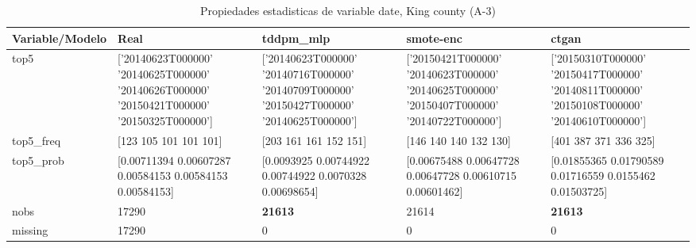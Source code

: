 \begin{table}[H]
\centering
\fontsize{8}{14}\selectfont
\caption{Propiedades  estadisticas de variable date, King county (A-3)}
\label{table-stats-king county-a-3-date}
\begin{tabular}{|l|m{10em}|m{10em}|m{10em}|m{10em}|}
\hline
 \rowcolor[gray]{0.8}
Variable/Modelo & Real & tddpm\_mlp & smote-enc & ctgan \\
\hline top5 & ['20140623T000000' '20140625T000000' '20140626T000000' '20150421T000000'
 '20150325T000000'] & ['20140623T000000' '20140716T000000' '20140709T000000' '20150427T000000'
 '20140625T000000'] & ['20150421T000000' '20140623T000000' '20140625T000000' '20150407T000000'
 '20140722T000000'] & ['20150310T000000' '20150417T000000' '20140811T000000' '20150108T000000'
 '20140610T000000'] \\
\hline top5\_freq & [123 105 101 101 101] & [203 161 161 152 151] & [146 140 140 132 130] & [401 387 371 336 325] \\
\hline top5\_prob & [0.00711394 0.00607287 0.00584153 0.00584153 0.00584153] & [0.0093925  0.00744922 0.00744922 0.0070328  0.00698654] & [0.00675488 0.00647728 0.00647728 0.00610715 0.00601462] & [0.01855365 0.01790589 0.01716559 0.0155462  0.01503725] \\
\hline nobs & 17290 & \bfseries 21613 & \cellcolor[rgb]{0.9, 0.54, 0.52} 21614 & \bfseries 21613 \\
\hline missing & 17290 & 0 & 0 & 0 \\
\hline
\end{tabular}
\end{table}

